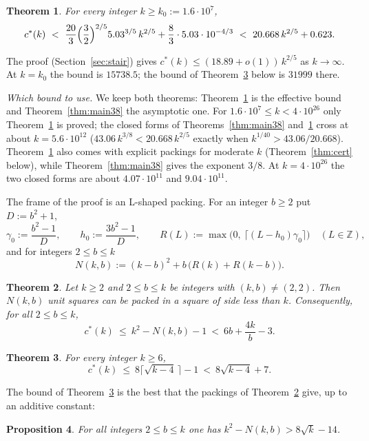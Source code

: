 \documentclass[11pt]{amsart}
\newcommand{\Z}{\mathbb Z}
\newcommand{\cs}{c^{*}}
\newtheorem{theorem}{Theorem}[section]
\newtheorem{proposition}[theorem]{Proposition}
\theoremstyle{definition}
\theoremstyle{remark}
\numberwithin{equation}{section}
\begin{document}
\begin{theorem}\label{thm:main}
For every integer $k\ge k_0:=1.6\cdot10^7$,
\[
\cs(k)\ <\ \frac{20}{3}\Bigl(\frac32\Bigr)^{2/5}5.03^{3/5}\,k^{2/5}+\frac83\cdot5.03\cdot10^{-4/3}
\ <\ 20.668\,k^{2/5}+0.623 .
\]
\end{theorem}

The proof (Section~\ref{sec:stair}) gives $\cs(k)\le(18.89+o(1))\,k^{2/5}$ as $k\to\infty$. At $k=k_0$ the bound is
$15738.5$; the bound of Theorem~\ref{thm:sqrt} below is $31999$ there.

\emph{Which bound to use.} We keep both theorems: Theorem~\ref{thm:main} is the effective bound and
Theorem~\ref{thm:main38} the asymptotic one. For $1.6\cdot10^7\le k<4\cdot10^{26}$ only Theorem~\ref{thm:main} is
proved; the closed forms of Theorems~\ref{thm:main38} and~\ref{thm:main} cross at about $k=5.6\cdot10^{12}$
($43.06\,k^{3/8}<20.668\,k^{2/5}$ exactly when $k^{1/40}>43.06/20.668$). Theorem~\ref{thm:main} also comes with explicit
packings for moderate $k$ (Theorem~\ref{thm:cert} below), while Theorem~\ref{thm:main38} gives the exponent $3/8$. At
$k=4\cdot10^{26}$ the two closed forms are about $4.07\cdot10^{11}$ and $9.04\cdot10^{11}$.

The frame of the proof is an L-shaped packing. For an integer $b\ge2$ put $D:=b^2+1$,
\[
\gamma_0:=\frac{b^2-1}{D},\qquad h_0:=\frac{3b^2-1}{D},\qquad
R(L):=\max\bigl(0,\ \lceil (L-h_0)\gamma_0\rceil\bigr)\quad(L\in\Z),
\]
and for integers $2\le b\le k$
\[
N(k,b):=(k-b)^2+b\,\bigl(R(k)+R(k-b)\bigr).
\]

\begin{theorem}\label{thm:A}
Let $k\ge2$ and $2\le b\le k$ be integers with $(k,b)\ne(2,2)$. Then $N(k,b)$ unit squares can be packed in a square of
side less than $k$. Consequently, for all $2\le b\le k$,
\[
\cs(k)\ \le\ k^2-N(k,b)-1\ <\ 6b+\frac{4k}{b}-3 .
\]
\end{theorem}

\begin{theorem}\label{thm:sqrt}
For every integer $k\ge6$,
\[
\cs(k)\ \le\ 8\bigl\lceil\sqrt{k-4}\,\bigr\rceil-1\ <\ 8\sqrt{k-4}+7 .
\]
\end{theorem}

The bound of Theorem~\ref{thm:sqrt} is the best that the packings of Theorem~\ref{thm:A} give, up to an additive
constant:

\begin{proposition}\label{prop:D}
For all integers $2\le b\le k$ one has $k^2-N(k,b)>8\sqrt k-14$.
\end{proposition}
\end{document}
